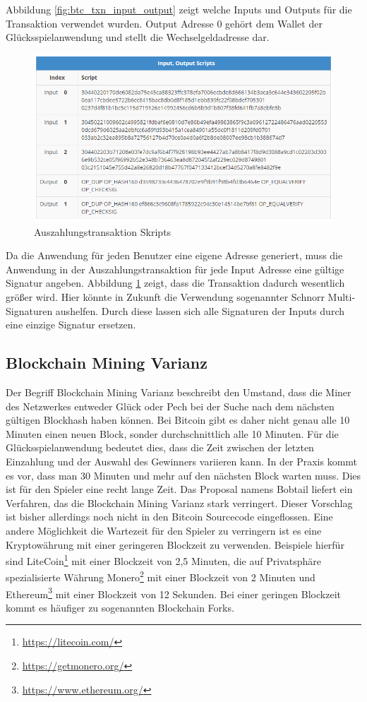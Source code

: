 Abbildung \ref{fig:btc_txn_input_output} zeigt welche Inputs und Outputs für die Transaktion verwendet wurden. Output Adresse 0 gehört dem Wallet der Glücksspielanwendung und stellt die Wechselgeldadresse dar.


\begin{figure}[H]
\centering
\includegraphics[width=1\linewidth]{Figures/btc_gui/btc_txn_input_output_scripts}
\decoRule
\caption{Auszahlungstransaktion Skripts}
\label{fig:btc_txn_input_output_scripts}
\end{figure}

Da die Anwendung für jeden Benutzer eine eigene Adresse generiert, muss die Anwendung in der Auszahlungstransaktion für jede Input Adresse eine gültige Signatur angeben. Abbildung \ref{fig:btc_txn_input_output_scripts} zeigt, dass die Transaktion dadurch wesentlich größer wird. Hier könnte in Zukunft die Verwendung sogenannter Schnorr Multi-Signaturen aushelfen. Durch diese lassen sich alle Signaturen der Inputs durch eine einzige Signatur ersetzen. \citep{schnorr_sig}


\subsection{Blockchain Mining Varianz}
Der Begriff Blockchain Mining Varianz beschreibt den Umstand, dass die Miner des Netzwerkes entweder Glück oder Pech bei der Suche nach dem nächsten gültigen Blockhash haben können. Bei Bitcoin gibt es daher nicht genau alle 10 Minuten einen neuen Block, sonder durchschnittlich alle 10 Minuten. Für die Glücksspielanwendung bedeutet dies, dass die Zeit zwischen der letzten Einzahlung und der Auswahl des Gewinners variieren kann. In der Praxis kommt es vor, dass man 30 Minuten und mehr auf den nächsten Block warten muss. Dies ist für den Spieler eine recht lange Zeit. Das Proposal namens Bobtail\cite{bobtail} liefert ein Verfahren, das die Blockchain Mining Varianz stark verringert. Dieser Vorschlag ist bisher allerdings noch nicht in den Bitcoin Sourcecode eingeflossen.
Eine andere Möglichkeit die Wartezeit für den Spieler zu verringern ist es eine  Kryptowährung mit einer geringeren Blockzeit zu verwenden. Beispiele hierfür sind LiteCoin\footnote{\url{https://litecoin.com/}} mit einer Blockzeit von 2,5 Minuten, die auf Privatsphäre spezialisierte Währung Monero\footnote{\url{https://getmonero.org/}} mit einer Blockzeit von 2 Minuten und Ethereum\footnote{\url{https://www.ethereum.org/}} mit einer Blockzeit von 12 Sekunden. Bei einer geringen Blockzeit kommt es häufiger zu sogenannten Blockchain Forks.


